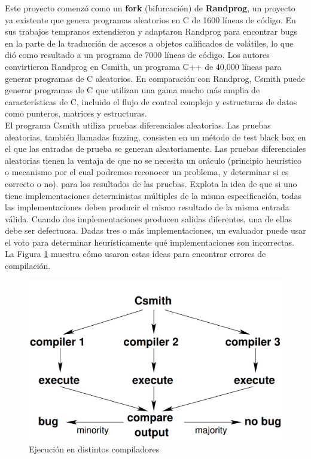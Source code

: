 Este proyecto comenzó como un \textbf{fork} (bifurcación) de \textbf{Randprog}\cite{randprog}, un proyecto ya existente que genera programas aleatorios en C de 1600 líneas de código. En sus trabajos tempranos extendieron y adaptaron Randprog para encontrar bugs en la parte de la traducción de accesos a objetos calificados de volátiles, lo que dió como resultado a un programa de 7000 líneas de código. 
Los autores convirtieron Randprog en Csmith, un programa C++ de 40,000 líneas para generar programas de C aleatorios. En comparación con Randprog, Csmith puede generar programas de C que utilizan una gama mucho más amplia de características de C, incluido el flujo de control complejo y estructuras de datos como punteros, matrices y estructuras.\\

El programa Csmith utiliza pruebas diferenciales aleatorias. Las pruebas aleatorias\cite{pinho2006reliable}, también llamadas fuzzing\cite{Miller:1990:ESR:96267.96279}, consisten en un método de test black box en el que las entradas de prueba se generan aleatoriamente. Las pruebas diferenciales aleatorias\cite{McKeeman98differentialtesting} tienen la ventaja de que no se necesita un oráculo (principio heurístico o mecanismo por el cual podremos reconocer un problema, y determinar si es correcto o no). para los resultados de las pruebas. Explota la idea de que si uno tiene implementaciones deterministas múltiples de la misma especificación, todas las implementaciones deben producir el mismo resultado de la misma entrada válida. Cuando dos implementaciones producen salidas diferentes, una de ellas debe ser defectuosa. Dadas tres o más implementaciones, un evaluador puede usar el voto para determinar heurísticamente qué implementaciones son incorrectas. La Figura \ref{fig:csmith compilers} muestra cómo usaron estas ideas para encontrar errores de compilación.\\

\begin{figure}[h]
    \centering
    \includegraphics[scale=0.3]{images/csmith1.png}
    \caption{Ejecución en distintos compiladores}
    \label{fig:csmith compilers}
\end{figure}

